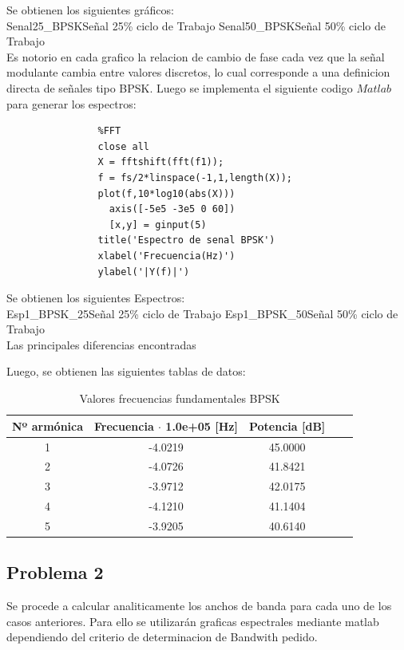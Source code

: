 \documentclass[letterpaper, titlepage]{article}
\begin{document}
			Se obtienen los siguientes gráficos:\\
					{Senal25_BPSK}{\label{fig:sim}}{Señal 25\% ciclo de Trabajo}
					{Senal50_BPSK}{\label{fig:sim}}{Señal 50\% ciclo de Trabajo}\\
					Es notorio en cada grafico la relacion de cambio de fase cada vez que la señal modulante cambia entre valores discretos, lo cual corresponde a una definicion directa de señales tipo BPSK.
			\newpage
			Luego se implementa el siguiente codigo $Matlab$ para generar los espectros:

			\begin{lstlisting}[label=some-code,caption=Codigo Matlab FFT BPSK]
				%%
				%FFT
				close all
				X = fftshift(fft(f1));
				f = fs/2*linspace(-1,1,length(X));
				plot(f,10*log10(abs(X)))
				  axis([-5e5 -3e5 0 60])
				  [x,y] = ginput(5)
				title('Espectro de senal BPSK')
				xlabel('Frecuencia(Hz)')
				ylabel('|Y(f)|')
			\end{lstlisting}

			Se obtienen los siguientes Espectros:\\
					 {Esp1_BPSK_25}{\label{fig:sim}}{Señal 25\% ciclo de Trabajo}
					 {Esp1_BPSK_50}{\label{fig:sim}}{Señal 50\% ciclo de Trabajo}\\
					 Las principales diferencias encontradas
	 
					 Luego, se obtienen las siguientes tablas de datos:
	 
			\begin{table}[ht]
				\centering
				\begin{tabular}{c c c c c}
					Nº armónica & Frecuencia $\cdot$ 1.0e+05 [Hz] & Potencia [dB]\\
					\hline
					1 & -4.0219 & 45.0000  \\
					2 & -4.0726 & 41.8421   \\
					3 & -3.9712 & 42.0175   \\
					4 & -4.1210 & 41.1404   \\
					5 & -3.9205 & 40.6140  
				\end{tabular}
				\caption{Valores frecuencias fundamentales BPSK}
				\label{tab:tabla1}
			\end{table}
		\newpage
	\subsection{Problema 2}
		Se procede a calcular analiticamente los anchos de banda para cada uno de los casos anteriores. Para ello se utilizarán graficas espectrales mediante matlab dependiendo del criterio de determinacion de Bandwith pedido.
\end{document}
